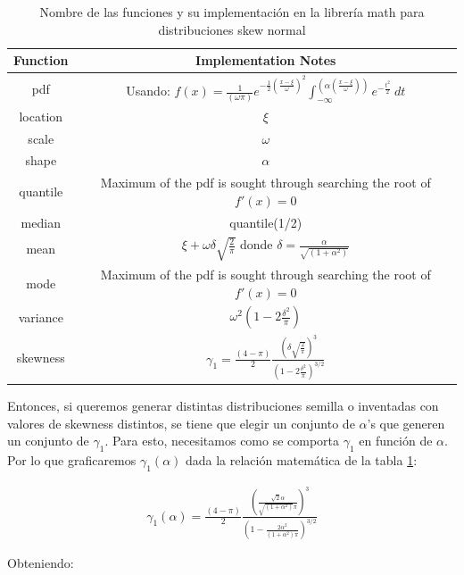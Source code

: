 \documentclass[11pt,letterpaper]{article}
\begin{document}
\begin{table}[H]
\centering
\begin{tabular}{|c|c|}
\hline
\textbf{Function} & \textbf{	
Implementation Notes} \\
\hline
pdf & Usando: $f(x) = \frac{1}{(\omega \pi)}e^{-\frac{1}{2}\left( \frac{x-\xi }{\omega }\right)^{2}} \int_{{-\infty }}^{\left(\alpha \left(\frac{x-\xi }{\omega } \right)\right)}e^{-\frac{t^2}{2}}\ dt$ \\
\hline
location & $\xi$ \\
\hline
scale &  $\omega$ \\
\hline
shape & $\alpha$ \\
\hline
quantile & Maximum of the pdf is sought through searching the root of $f'(x)=0$ \\
\hline
median & quantile(1/2) \\
\hline
mean & $\xi + \omega \delta \sqrt{\frac{2}{\pi}}$ donde $\delta = \frac{\alpha}{\sqrt{(1+\alpha^2)}}$ \\
\hline
mode & Maximum of the pdf is sought through searching the root of $f'(x)=0$ \\
\hline
variance & $\omega^2\left( 1-2\frac{\delta^2}{\pi}\right)$ \\
\hline
skewness & $  \gamma_1 = \frac{(4-\pi)}{2} \frac{\left(\delta \sqrt{\frac{2}{\pi}} \right)^3}{\left(1-2\frac{\delta^2}{\pi} \right)^{3/2}}$ \\
\hline
\end{tabular}
\caption{Nombre de las funciones y su implementación en la librería math para distribuciones skew normal}
\label{boost_functions}
\end{table}

Entonces, si queremos generar distintas distribuciones semilla o inventadas con valores de skewness distintos, se tiene que elegir un conjunto de $\alpha$'s que generen un conjunto de $\gamma_1$. Para esto, necesitamos como se comporta $\gamma_1$ en función de $\alpha$. Por lo que graficaremos $\gamma_1(\alpha)$ dada la relación matemática de la tabla \ref{boost_functions}:

\begin{align}
 \gamma_1(\alpha) = \frac{(4-\pi)}{2} \frac{\left( \frac{\sqrt{2}\alpha}{\sqrt{(1+\alpha^2)}\pi} \right)^3}{\left(1-\frac{2\alpha^2}{(1+\alpha^2)\pi}\right)^{3/2}}
\end{align}

Obteniendo:
\end{document}
